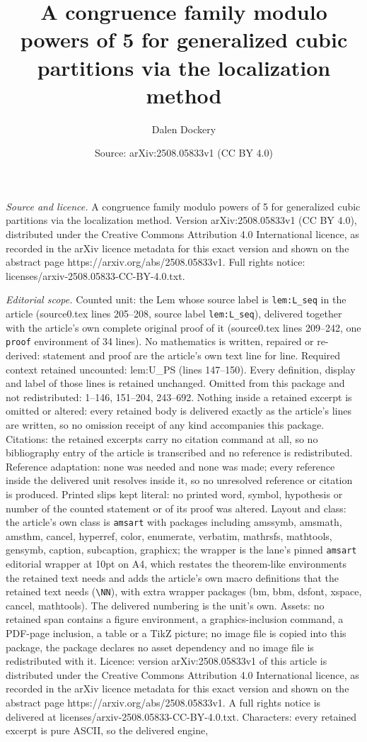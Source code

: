 \documentclass[10pt,a4paper]{amsart}
\title[A congruence family modulo powers of 5 for generalized cubic]{A congruence family modulo powers of 5 for generalized cubic partitions via the localization method}
\author{Dalen Dockery}
\date{Source: arXiv:2508.05833v1 (CC BY 4.0)}
\begin{document}
\maketitle

\noindent\emph{Source and licence.} A congruence family modulo powers of 5 for generalized cubic partitions via the localization method. Version arXiv:2508.05833v1 (CC BY 4.0), distributed under the Creative Commons Attribution 4.0 International licence, as recorded in the arXiv licence metadata for this exact version and shown on the abstract page https://arxiv.org/abs/2508.05833v1. Full rights notice: licenses/arxiv-2508.05833-CC-BY-4.0.txt.\par\smallskip

\noindent\textit{Editorial scope.} Counted unit: the Lem whose source label is \texttt{lem:L\_seq} in the article (source0.tex lines 205--208, source label \texttt{lem:L\_seq}), delivered together with the article's own complete original proof of it (source0.tex lines 209--242, one \texttt{proof} environment of 34 lines). No mathematics is written, repaired or re-derived: statement and proof are the article's own text line for line. Required context retained uncounted: lem:U\_PS (lines 147--150). Every definition, display and label of those lines is retained unchanged. Omitted from this package and not redistributed: 1--146, 151--204, 243--692. Nothing inside a retained excerpt is omitted or altered: every retained body is delivered exactly as the article's lines are written, so no omission receipt of any kind accompanies this package. Citations: the retained excerpts carry no citation command at all, so no bibliography entry of the article is transcribed and no reference is redistributed. Reference adaptation: none was needed and none was made; every reference inside the delivered unit resolves inside it, so no unresolved reference or citation is produced. Printed slips kept literal: no printed word, symbol, hypothesis or number of the counted statement or of its proof was altered. Layout and class: the article's own class is \texttt{amsart} with packages including amssymb, amsmath, amsthm, cancel, hyperref, color, enumerate, verbatim, mathrsfs, mathtools, gensymb, caption, subcaption, graphicx; the wrapper is the lane's pinned \texttt{amsart} editorial wrapper at 10pt on A4, which restates the theorem-like environments the retained text needs and adds the article's own macro definitions that the retained text needs (\texttt{\textbackslash NN}), with extra wrapper packages (bm, bbm, dsfont, xspace, cancel, mathtools). The delivered numbering is the unit's own. Assets: no retained span contains a figure environment, a graphics-inclusion command, a PDF-page inclusion, a table or a TikZ picture; no image file is copied into this package, the package declares no asset dependency and no image file is redistributed with it. Licence: version arXiv:2508.05833v1 of this article is distributed under the Creative Commons Attribution 4.0 International licence, as recorded in the arXiv licence metadata for this exact version and shown on the abstract page https://arxiv.org/abs/2508.05833v1. A full rights notice is delivered at licenses/arxiv-2508.05833-CC-BY-4.0.txt. Characters: every retained excerpt is pure ASCII, so the delivered engine, 
\end{document}
